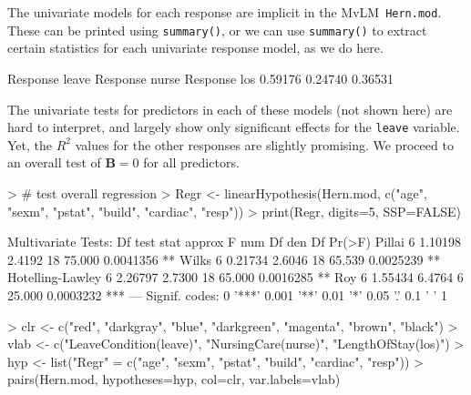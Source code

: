 \documentclass[11pt]{article}
\newcommand{\mat}[1]{\ensuremath{\bm{#1}}}
\newcommand*{\MLM}{MvLM\xspace}
\newcommand{\code}[1]{{\texttt{#1}}}
\newcommand{\func}[1]{{\texttt{#1()}}}
\begin{document}
The univariate models for each response are implicit in the \MLM\ \code{Hern.mod}.
These can be printed using \func{summary}, or we can use \func{summary} to extract
certain statistics for each univariate response model, as we do here.

\begin{Schunk}
\begin{Soutput}
Response leave Response nurse   Response los 
       0.59176        0.24740        0.36531 
\end{Soutput}
\end{Schunk}
The univariate tests for predictors in each of these models (not shown here)
are hard to interpret, and largely show only significant effects for 
the \code{leave} variable.  Yet, the $R^2$ values for the other responses
are slightly promising.  We proceed to an overall test of $\mat{B} = 0$
for all predictors.

\begin{Schunk}
\begin{Sinput}
> # test overall regression
> Regr <- linearHypothesis(Hern.mod, c("age", "sexm", "pstat", "build", "cardiac", "resp"))
> print(Regr, digits=5, SSP=FALSE)
\end{Sinput}
\begin{Soutput}
Multivariate Tests: 
                 Df test stat approx F num Df den Df    Pr(>F)    
Pillai            6   1.10198   2.4192     18 75.000 0.0041356 ** 
Wilks             6   0.21734   2.6046     18 65.539 0.0025239 ** 
Hotelling-Lawley  6   2.26797   2.7300     18 65.000 0.0016285 ** 
Roy               6   1.55434   6.4764      6 25.000 0.0003232 ***
---
Signif. codes:  0 '***' 0.001 '**' 0.01 '*' 0.05 '.' 0.1 ' ' 1 
\end{Soutput}
\end{Schunk}

\begin{Schunk}
\begin{Sinput}
> clr <- c("red", "darkgray", "blue", "darkgreen", "magenta", "brown", "black")
> vlab <- c("LeaveCondition\n(leave)", "NursingCare\n(nurse)", "LengthOfStay\n(los)")
> hyp <- list("Regr" = c("age", "sexm", "pstat", "build", "cardiac", "resp"))
> pairs(Hern.mod, hypotheses=hyp, col=clr, var.labels=vlab)
\end{Sinput}
\end{Schunk}
\end{document}
